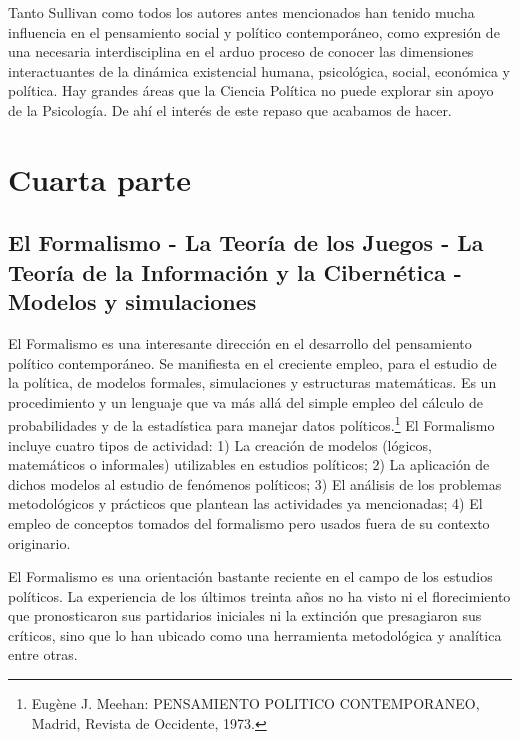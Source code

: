 \documentclass[
]{book}
\begin{document}
Tanto Sullivan como todos los autores antes mencionados han tenido mucha influencia en el pensamiento social y político contemporáneo, como expresión de una necesaria interdisciplina en el arduo proceso de conocer las dimensiones interactuantes de la dinámica existencial humana, psicológica, social, económica y política. Hay grandes áreas que la Ciencia Política no puede explorar sin apoyo de la Psicología. De ahí el interés de este repaso que acabamos de hacer.

\hypertarget{cuarta-parte-1}{%
\section*{Cuarta parte}\label{cuarta-parte-1}}

\hypertarget{el-formalismo---la-teoruxeda-de-los-juegos---la-teoruxeda-de-la-informaciuxf3n-y-la-cibernuxe9tica---modelos-y-simulaciones}{%
\subsection*{El Formalismo - La Teoría de los Juegos - La Teoría de la Información y la Cibernética - Modelos y simulaciones}\label{el-formalismo---la-teoruxeda-de-los-juegos---la-teoruxeda-de-la-informaciuxf3n-y-la-cibernuxe9tica---modelos-y-simulaciones}}

El Formalismo es una interesante dirección en el desarrollo del pensamiento político contemporáneo. Se manifiesta en el creciente empleo, para el estudio de la política, de modelos formales, simulaciones y estructuras matemáticas. Es un procedimiento y un lenguaje que va más allá del simple empleo del cálculo de probabilidades y de la estadística para manejar datos políticos.\footnote{Eugène J. Meehan: PENSAMIENTO POLITICO CONTEMPORANEO, Madrid, Revista de Occidente, 1973.} El Formalismo incluye cuatro tipos de actividad: 1) La creación de modelos (lógicos, matemáticos o informales) utilizables en estudios políticos; 2) La aplicación de dichos modelos al estudio de fenómenos políticos; 3) El análisis de los problemas metodológicos y prácticos que plantean las actividades ya mencionadas; 4) El empleo de conceptos tomados del formalismo pero usados fuera de su contexto originario.

El Formalismo es una orientación bastante reciente en el campo de los estudios políticos. La experiencia de los últimos treinta años no ha visto ni el florecimiento que pronosticaron sus partidarios iniciales ni la extinción que presagiaron sus críticos, sino que lo han ubicado como una herramienta metodológica y analítica entre otras.
\end{document}
